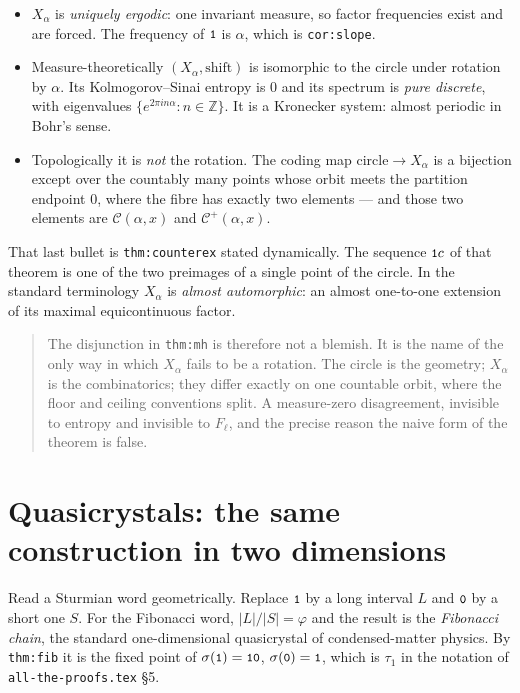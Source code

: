 \documentclass[11pt,a4paper]{article}
\newcommand{\seq}[1]{\texttt{\small #1}}
\newcommand{\C}{\mathcal{C}}
\newcommand{\Cp}{\mathcal{C}^{+}}
\newcommand{\Z}{\mathbb{Z}}
\theoremstyle{definition}
\theoremstyle{plain}
\begin{document}
\begin{itemize}
\item $X_\alpha$ is \emph{uniquely ergodic}: one invariant measure, so factor
  frequencies exist and are forced. The frequency of $\seq{1}$ is $\alpha$,
  which is \texttt{cor:slope}.
\item Measure-theoretically $(X_\alpha, \text{shift})$ is isomorphic to the
  circle under rotation by $\alpha$. Its Kolmogorov--Sinai entropy is $0$ and
  its spectrum is \emph{pure discrete}, with eigenvalues
  $\{e^{2\pi i n\alpha} : n \in \Z\}$. It is a Kronecker system: almost
  periodic in Bohr's sense.
\item Topologically it is \emph{not} the rotation. The coding map
  $\text{circle} \to X_\alpha$ is a bijection except over the countably many
  points whose orbit meets the partition endpoint $0$, where the fibre has
  exactly two elements --- and those two elements are $\C(\alpha,x)$ and
  $\Cp(\alpha,x)$.
\end{itemize}

That last bullet is \texttt{thm:counterex} stated dynamically. The sequence
$\seq{1}c$ of that theorem is one of the two preimages of a single point of the
circle. In the standard terminology $X_\alpha$ is \emph{almost automorphic}: an
almost one-to-one extension of its maximal equicontinuous factor.

\begin{quote}
The disjunction in \texttt{thm:mh} is therefore not a blemish. It is the name of
the only way in which $X_\alpha$ fails to be a rotation. The circle is the
geometry; $X_\alpha$ is the combinatorics; they differ exactly on one countable
orbit, where the floor and ceiling conventions split. A measure-zero
disagreement, invisible to entropy and invisible to $F_\ell$, and the precise
reason the naive form of the theorem is false.
\end{quote}

\section{Quasicrystals: the same construction in two dimensions}

Read a Sturmian word geometrically. Replace $\seq{1}$ by a long interval $L$ and
$\seq{0}$ by a short one $S$. For the Fibonacci word, $|L|/|S| = \varphi$ and the
result is the \emph{Fibonacci chain}, the standard one-dimensional quasicrystal
of condensed-matter physics. By \texttt{thm:fib} it is the fixed point of
$\sigma(\seq{1}) = \seq{10}$, $\sigma(\seq{0}) = \seq{1}$, which is $\tau_1$ in
the notation of \texttt{all-the-proofs.tex} \S5.
\end{document}
